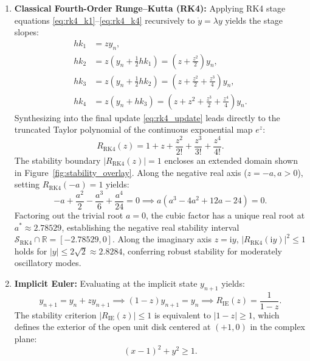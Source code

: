 \documentclass[11pt,a4paper]{article}
\theoremstyle{definition}
\theoremstyle{remark}
\begin{document}
\begin{enumerate}
    \item \textbf{Classical Fourth-Order Runge--Kutta (RK4):} Applying RK4 stage equations \eqref{eq:rk4_k1}--\eqref{eq:rk4_k4} recursively to $\dot{y} = \lambda y$ yields the stage slopes:
    \begin{align}
    h k_1 &= z y_n, \label{eq:rk4_stg1} \\
    h k_2 &= z \left( y_n + \frac{1}{2} h k_1 \right) = \left( z + \frac{z^2}{2} \right) y_n, \label{eq:rk4_stg2} \\
    h k_3 &= z \left( y_n + \frac{1}{2} h k_2 \right) = \left( z + \frac{z^2}{2} + \frac{z^3}{4} \right) y_n, \label{eq:rk4_stg3} \\
    h k_4 &= z \left( y_n + h k_3 \right) = \left( z + z^2 + \frac{z^3}{2} + \frac{z^4}{4} \right) y_n. \label{eq:rk4_stg4}
    \end{align}
    Synthesizing into the final update \eqref{eq:rk4_update} leads directly to the truncated Taylor polynomial of the continuous exponential map $e^z$:
    \begin{equation}
    \label{eq:R_RK4}
    R_{\mathrm{RK4}}(z) = 1 + z + \frac{z^2}{2!} + \frac{z^3}{3!} + \frac{z^4}{4!}.
    \end{equation}
    The stability boundary $|R_{\mathrm{RK4}}(z)| = 1$ encloses an extended domain shown in Figure~\ref{fig:stability_overlay}. Along the negative real axis ($z = -a, a > 0$), setting $R_{\mathrm{RK4}}(-a) = 1$ yields:
    \begin{equation}
    \label{eq:rk4_real_root}
    -a + \frac{a^2}{2} - \frac{a^3}{6} + \frac{a^4}{24} = 0 \implies a\left(a^3 - 4a^2 + 12a - 24\right) = 0.
    \end{equation}
    Factoring out the trivial root $a = 0$, the cubic factor has a unique real root at $a^* \approx 2.78529$, establishing the negative real stability interval $\mathcal{S}_{\mathrm{RK4}} \cap \mathbb{R} = [-2.78529, 0]$. Along the imaginary axis $z = \mathrm{i}y$, $|R_{\mathrm{RK4}}(\mathrm{i}y)|^2 \le 1$ holds for $|y| \le 2\sqrt{2} \approx 2.8284$, conferring robust stability for moderately oscillatory modes.

    \item \textbf{Implicit Euler:} Evaluating at the implicit state $y_{n+1}$ yields:
    \begin{equation}
    \label{eq:R_IE}
    y_{n+1} = y_n + z y_{n+1} \implies (1 - z)y_{n+1} = y_n \implies R_{\mathrm{IE}}(z) = \frac{1}{1 - z}.
    \end{equation}
    The stability criterion $|R_{\mathrm{IE}}(z)| \le 1$ is equivalent to $|1 - z| \ge 1$, which defines the exterior of the open unit disk centered at $(+1, 0)$ in the complex plane:
    \begin{equation}
    \label{eq:IE_domain}
    (x - 1)^2 + y^2 \ge 1.
    \end{equation}
\end{enumerate}
\end{document}
